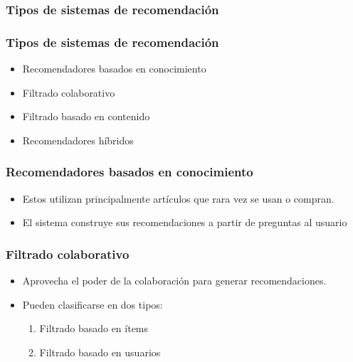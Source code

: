 \documentclass[
  shownotes,
  xcolor={svgnames},
  hyperref={colorlinks,citecolor=DarkBlue,linkcolor=Black,urlcolor=DarkBlue}
  , aspectratio=169]{beamer}
\begin{document}
\subsubsection{Tipos de sistemas de recomendación}
\begin{frame}
\frametitle{Tipos de sistemas de recomendación}


\begin{itemize}
\item Recomendadores basados en conocimiento
\medskip
\item Filtrado colaborativo
\medskip
\item Filtrado basado en contenido
\medskip
\item Recomendadores híbridos
\end{itemize}


\end{frame}    
\begin{frame}
\frametitle{Recomendadores basados en conocimiento}

   
   \begin{itemize}
    \item Estos utilizan principalmente artículos que rara vez se usan o compran. 
        \medskip
    \item  El sistema construye sus recomendaciones a partir de preguntas al usuario    
   \end{itemize}



\end{frame}    
\begin{frame}
\frametitle{Filtrado colaborativo}
    

    \begin{itemize}
    
    
\item Aprovecha el poder de la colaboración para generar recomendaciones. 

\medskip
\item Pueden clasificarse en dos tipos:
\medskip
    \begin{enumerate}

        \item Filtrado basado en ítems
\medskip
        \item Filtrado basado en usuarios
\end{enumerate}

\end{itemize}
    

\end{frame}    
\end{document}
